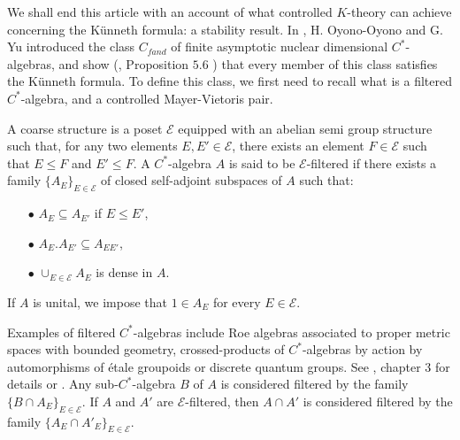 We shall end this article with an account of what controlled $K$-theory can achieve concerning the Künneth formula: a stability result. In \cite{OY4}, H. Oyono-Oyono and G. Yu introduced the class $C_{fand}$ of finite asymptotic nuclear dimensional $C^*$-algebras, and show (\cite{OY4}, Proposition $5.6$ ) that every member of this class satisfies the Künneth formula. To define this class, we first need to recall what is a filtered $C^*$-algebra, and a controlled Mayer-Vietoris pair.

\begin{definition}
A coarse structure is a poset $\mathcal E$ equipped with an abelian semi group structure such that, for any two elements $E,E'\in \mathcal E$, there exists an element $F\in \mathcal E$ such that $E\leq F$ and $E'\leq F$. A $C^*$-algebra $A$ is said to be $\mathcal E$-filtered if there exists a family $\{A_E \}_{E\in \mathcal E}$ of closed self-adjoint subspaces of $A$ such that:
\begin{itemize}
\item[$\bullet$] $A_E \subseteq A_{E'}$ if $E\leq E'$,
\item[$\bullet$] $A_E . A_{E'} \subseteq A_{EE'}$,
\item[$\bullet$] $\cup_{E\in \mathcal E} A_E$ is dense in $A$.
\end{itemize} 
If $A$ is unital, we impose that $1\in A_E$ for every $E\in \mathcal E$.
\end{definition} 

Examples of filtered $C^*$-algebras include Roe algebras associated to proper metric spaces with bounded geometry, crossed-products of $C^*$-algebras by action by automorphisms of \'etale groupoids or discrete quantum groups. See \cite{DellAieraThesis}, chapter $3$ for details or \cite{dell2017controlled}. Any sub-$C^*$-algebra $B$ of $A$ is considered filtered by the family $\{B\cap A_E\}_{E\in \mathcal E}$. If $A$ and $A'$ are $\mathcal E$-filtered, then $A\cap A'$ is considered filtered by the family $\{A_E\cap A'_E\}_{E\in \mathcal E}$. \\

